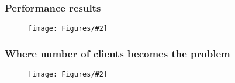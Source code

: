 \documentclass[10pt]{beamer}
\newcommand{\addfigure}[2]{

\begin{figure}[h]
	\centering
	\texttt{[image: Figures/\#2]} 
\end{figure}

}
\begin{document}
\begin{frame}
\frametitle{Performance results}

\addfigure{0.4}{performance.pdf}
\end{frame}

\begin{frame}
\frametitle{Where number of clients becomes the problem}
\addfigure{0.4}{clients.pdf}
\end{frame}
\end{document}
